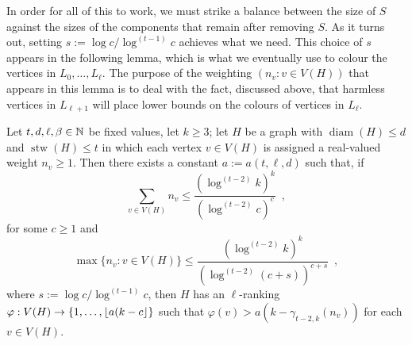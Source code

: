 \documentclass[kpfonts]{patmorin}
\DeclareMathOperator{\diam}{diam}
\DeclareMathOperator{\stw}{stw}
\theoremstyle{named}
\begin{document}
In order for all of this to work, we must strike a balance between the size of $S$ against the sizes of the components that remain after removing $S$.  As it turns out, setting $s:=\log c/\log^{(t-1)} c$ achieves what we need.  This choice of $s$ appears in the following lemma, which is what we eventually use to colour the vertices in $L_0,\ldots,L_\ell$.  The purpose of the weighting $(n_v:v\in V(H))$ that appears in this lemma is to deal with the fact, discussed above, that harmless vertices in $L_{\ell+1}$ will place lower bounds on the colours of vertices in $L_{\ell}$.



\begin{lem}\label{t-tree-slack}
    Let $t,d,\ell,\beta\in\mathbb{N}$ be fixed values, let $k\ge 3$; let $H$ be a graph with $\diam(H)\le d$ and $\stw(H)\le t$ in which each vertex $v\in V(H)$ is assigned a real-valued weight $n_v\ge 1$. Then there exists a constant $a:=a(t,\ell,d)$ such that, if
    \begin{equation}
         \sum_{v\in V(H)} n_v \le \frac{(\log^{(t-2)} k)^k}{(\log^{(t-2)} c)^{c}} \enspace ,
     \label{total-weight}
    \end{equation}
    for some $c\ge 1$ and
    \begin{equation}
         \max\{n_v:v\in V(H)\} \le \frac{(\log^{(t-2)} k)^k}{(\log^{(t-2)} (c+s))^{c+s}} \enspace ,
     \label{max-weight}
    \end{equation}
    where $s := \log c/\log^{(t-1)} c$, then $H$ has an $\ell$-ranking $\varphi:V(H)\to\{1,\ldots, {\lfloor a(k-c \rfloor}\}$ such that $\varphi(v)> a(k-\gamma_{t-2,k}(n_v))$ for each $v\in V(H)$.
\end{lem}
\end{document}
